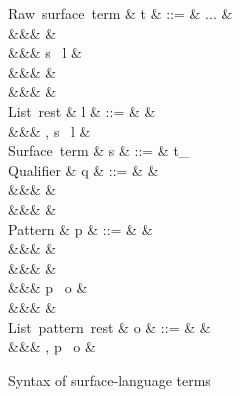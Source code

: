 \begin{figure}[H]
\begin{syntaxfig}
\mbox{Raw surface term}
&
t
&
::=
&
...
&
\\
&&&
&
\\
&&&
\kw{\lbrack}s \ l
&
\\
&&&
&
\\
&&&
&
\\[2mm]

\mbox{List rest}
&
l
&
::=
&
\rbrack
&
\\
&&&
, s \ l
&
\\[2mm]

\mbox{Surface term}
&
s
&
::=
&
t_{\alpha}
\\[2mm]


\mbox{Qualifier}
&
q
&
::=
&
&
\\
&&&
&
\\
&&&
&
\\[2mm]


\mbox{Pattern}
&
p
&
::=
&
&
\\
&&&
\pattNil
&
\\
&&&
&
\\
&&&
\lbrack p \ o
&
\\
&&&
&
\\[2mm]

\mbox{List pattern rest}
&
o
&
::=
&
\rbrack
&
\\
&&&
, p \ o
&
\\[2mm]
\end{syntaxfig}
\caption{Syntax of surface-language terms}
\end{figure}
